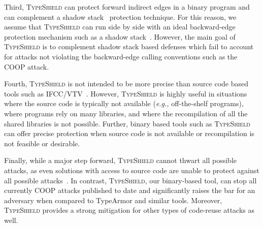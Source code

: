 Third, \textsc{TypeShield} can protect forward indirect edges 
in a binary program and can complement a shadow stack~\cite{dang:asiaccs} protection technique. For this reason, we assume that \textsc{TypeShield} can run side by side with an 
ideal backward-edge protection mechanism such as a shadow stack~\cite{conti:ccs}. However, the main goal of \textsc{TypeShield} is to complement 
shadow stack based defenses which fail to account for attacks not violating the backward-edge calling conventions such as the COOP attack.

Fourth, \textsc{TypeShield} is not intended to be more precise than source code based tools such as IFCC/VTV~\cite{vtv:tice}. However, 
\textsc{TypeShield} is highly useful in situations where the source code is typically not available (\textit{e.g.,} off-the-shelf programs), 
where programs rely on many libraries, and where the recompilation of all the shared libraries is not possible. 
Further, binary based tools such as \textsc{TypeShield} can offer precise protection when source code is not available or 
recompilation is not feasible or desirable.

Finally, while a major step forward, \textsc{TypeShield} cannot thwart all possible attacks, as even solutions with access to source 
code are unable to protect against all possible attacks~\cite{carlini:bending}. In contrast, \textsc{TypeShield}, our binary-based tool, 
can stop all currently COOP attacks published to date and significantly raises the bar for an adversary when compared to
TypeArmor and similar tools. Moreover, \textsc{TypeShield} provides a strong mitigation for other types of code-reuse attacks as well.
